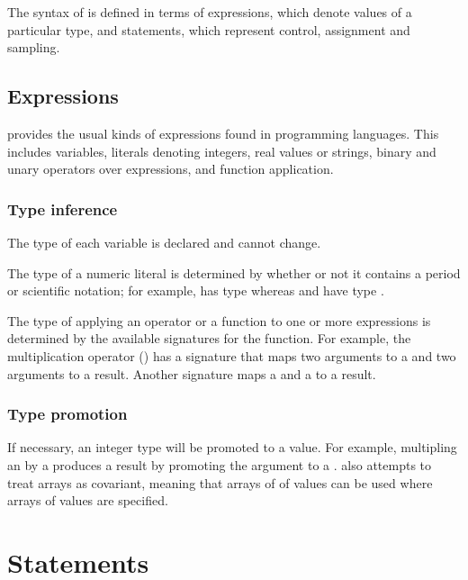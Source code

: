 \documentclass[article]{jss}
\begin{document}
The syntax of  is defined in terms of expressions, which
denote values of a particular type, and statements, which represent
control, assignment and sampling.

\subsection{Expressions}

 provides the usual kinds of expressions found in
programming languages.  This includes variables, literals denoting
integers, real values or strings, binary and unary operators over
expressions, and function application.  

\subsubsection{Type inference}

The type of each variable is declared and cannot change.  

The type of a numeric literal is determined by whether or not it
contains a period or scientific notation; for example,  has
type  whereas  and  have type
.

The type of applying an operator or a function to one or more
expressions is determined by the available signatures for the
function.  For example, the multiplication operator (\code{*}) has a
signature that maps two  arguments to a  and two
 arguments to a  result.  Another signature maps
a  and a  to a  result.

\subsubsection{Type promotion}

If necessary, an integer type will be promoted to a  value.
For example, multipling an  by a  produces a
 result by promoting the  argument to a
.   also attempts to treat arrays as
covariant, meaning that arrays of of  values can be used
where arrays of  values are specified.

\section{Statements}
\end{document}

